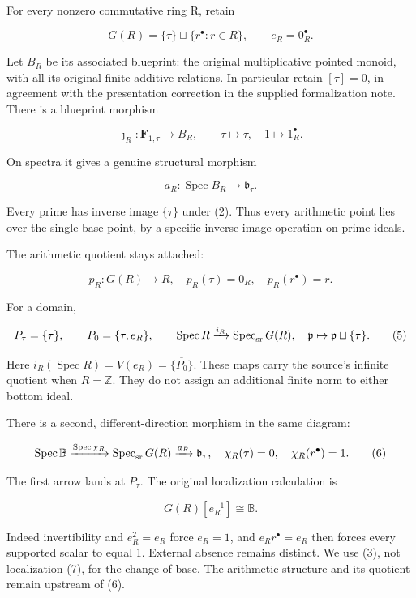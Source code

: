 For every nonzero commutative ring R, retain

\[
G(R)=\{\tau\}\sqcup\{r^\bullet:r\in R\},\qquad e_R=0_R^\bullet.
\tag{1}
\]

Let \(B_R\) be its associated blueprint: the original multiplicative pointed monoid, with all its original finite additive relations. In particular retain \([\tau]=0\), in agreement with the presentation correction in the supplied formalization note. There is a blueprint morphism

\[
\jmath_R:\mathbf F_{1,\tau}\longrightarrow B_R,
\qquad \tau\mapsto\tau,\quad1\mapsto1_R^\bullet.
\tag{2}
\]

On spectra it gives a genuine structural morphism

\[
a_R:\operatorname{Spec}B_R\longrightarrow\mathfrak b_\tau.
\tag{3}
\]

Every prime has inverse image \(\{\tau\}\) under (2). Thus every arithmetic point lies over the single base point, by a specific inverse-image operation on prime ideals.

The arithmetic quotient stays attached:

\[
p_R:G(R)\longrightarrow R,
\quad p_R(\tau)=0_R,\quad p_R(r^\bullet)=r.
\tag{4}
\]

For a domain,

\[
P_\tau=\{\tau\},\qquad P_0=\{\tau,e_R\},\qquad
\operatorname{Spec}R\xrightarrow{i_R}\operatorname{Spec}_{\rm sr}G(R),
\quad\mathfrak p\mapsto\mathfrak p\sqcup\{\tau\}.
\tag{5}
\]

Here \(i_R(\operatorname{Spec}R)=V(e_R)=\overline{\{P_0\}}\). These maps carry the source's infinite quotient when \(R=\mathbb Z\). They do not assign an additional finite norm to either bottom ideal.

There is a second, different-direction morphism in the same diagram:

\[
\operatorname{Spec}\mathbb B\xrightarrow{\operatorname{Spec}\chi_R}
\operatorname{Spec}_{\rm sr}G(R)\xrightarrow{a_R}\mathfrak b_\tau,
\quad
\chi_R(\tau)=0,\quad\chi_R(r^\bullet)=1.
\tag{6}
\]

The first arrow lands at \(P_\tau\). The original localization calculation is

\[
G(R)[e_R^{-1}]\cong\mathbb B.
\tag{7}
\]

Indeed invertibility and \(e_R^2=e_R\) force \(e_R=1\), and \(e_Rr^\bullet=e_R\) then forces every supported scalar to equal 1. External absence remains distinct. We use (3), not localization (7), for the change of base. The arithmetic structure and its quotient remain upstream of (6).

